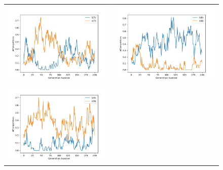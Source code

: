 \documentclass{article}
\begin{document}
\begin{figure}[H]
\begin{adjustbox}{width=0.6\paperwidth}
\begin{tabular}{c c}
			\includegraphics{Codes/Problem_2 Construction_1/Comp_7.jpg} & \includegraphics{Codes/Problem_2 Construction_1/Comp_8.jpg} \\
			\includegraphics{Codes/Problem_2 Construction_1/Comp_9.jpg}&

\end{tabular}
\end{adjustbox}
\end{figure}
\end{document}
